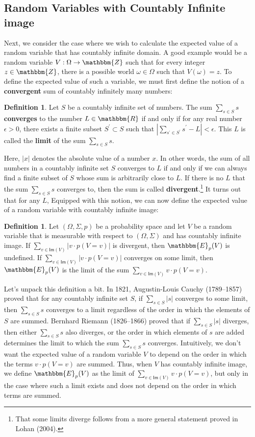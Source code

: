 \documentclass[11pt]{article}
\theoremstyle{definition}
\newtheorem{definition}[theorem]{Definition}
\theoremstyle{remark}
\begin{document}
\subsection{Random Variables with Countably Infinite image}\label{subsec:count}
Next, we consider the case where we wish to calculate the expected value of a random variable that has countably infinite domain. A good example would be a random variable $V:\Omega\rightarrow\mathbbm{Z}$ such that for every integer $z\in\mathbbm{Z}$, there is a possible world $\omega\in\Omega$ such that $V(\omega)=z$. To define the expected value of such a variable, we must first define the notion of a \textbf{convergent} sum of countably infinitely many numbers:
\begin{definition}
    Let $S$ be a countably infinite set of numbers. The sum $\sum_{s\in S}s$ \textbf{converges} to the number $L\in\mathbbm{R}$ if and only if for any real number $\epsilon>0$, there exists a finite subset $S^{\prime}\subset S$ such that $|\sum_{s^{\prime}\in S^{\prime}}s^{\prime}-L|<\epsilon$. This $L$ is called the \textbf{limit} of the sum $\sum_{s\in S}s$.
\end{definition}
\noindent
Here, $|x|$ denotes the absolute value of a number $x$. In other words, the sum of all numbers in a countably infinite set $S$ converges to $L$ if and only if we can always find a finite subset of $S$ whose sum is arbitrarily close to $L$. If there is no $L$ that the sum $\sum_{s\in S}s$ converges to, then the sum is called \textbf{divergent}.\footnote{That some limits diverge follows from a more general statement proved in Lohan (2004).} It turns out that for any $L$, Equipped with this notion, we can now define the expected value of a random variable with countably infinite image:
\begin{definition}\label{def:evcount}
    Let $(\Omega,\Sigma,p)$ be a probability space and let $V$ be a random variable that is measurable with respect to $(\Omega,\Sigma)$ and has countably infinite image. If $\sum_{v\in\textsf{Im}(V)}|v\cdot p(V=v)|$ is divergent, then $\mathbbm{E}_{p}(V)$ is undefined. If $\sum_{v\in\textsf{Im}(V)}|v\cdot p(V=v)|$ converges on some limit, then $\mathbbm{E}_{p}(V)$ is the limit of the sum $\sum_{v\in\textsf{Im}(V)}v\cdot p(V=v)$.
\end{definition}
\noindent
Let's unpack this definition a bit. In 1821, Augustin-Louis Cauchy (1789–1857) proved that for any countably infinite set $S$, if $\sum_{s\in S}|s|$ converges to some limit, then $\sum_{s\in S}s$ converges to a limit regardless of the order in which the elements of $S$ are summed. Bernhard Riemann (1826–1866) proved that if $\sum_{s\in S}|s|$ diverges, then either $\sum_{s\in S}s$ also diverges, or the order in which elements of $s$ are added determines the limit to which the sum $\sum_{s\in S}s$ converges. Intuitively, we don't want the expected value of a random variable $V$ to depend on the order in which the terms $v\cdot p(V=v)$ are summed. Thus, when $V$ has countably infinite image, we define $\mathbbm{E}_{p}(V)$ as the limit of $\sum_{v\in\textsf{Im}(V)}v\cdot p(V=v)$, but only in the case where such a limit exists and does not depend on the order in which terms are summed.\par 
\end{document}
